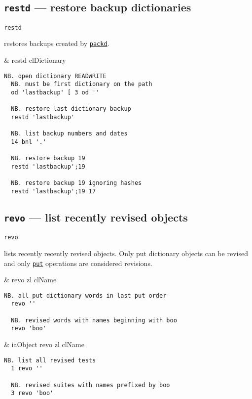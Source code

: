 \subsection{\texttt{restd} --- restore backup dictionaries}\label{ss:restd} 

\hypertarget{il:restd}{\texttt{restd}}  restores  backups created by
 \hyperlink{il:packd}{\texttt{packd}}. 

\begin{wordhead}
\monad & restd clDictionary \\
\end{wordhead}
\begin{lstlisting}[frame=single,framerule=0pt] 
  NB. open dictionary READWRITE 
  NB. must be first dictionary on the path
  od 'lastbackup' [ 3 od '' 

  NB. restore last dictionary backup
  restd 'lastbackup' 

  NB. list backup numbers and dates
  14 bnl '.'

  NB. restore backup 19 
  restd 'lastbackup';19

  NB. restore backup 19 ignoring hashes
  restd 'lastbackup';19 17
\end{lstlisting}                   


\subsection{\texttt{revo} --- list recently revised objects} 

\hypertarget{il:revo}{\texttt{revo}} lists recently recently revised objects. 
Only put dictionary objects can be revised and only 
\hyperlink{il:put}{\texttt{put}} operations are considered revisions. 

\begin{wordhead}
\monad & revo zl \argsep clName \\
\end{wordhead}
\begin{lstlisting}[frame=single,framerule=0pt] 
  NB. all put dictionary words in last put order
  revo ''   
    
  NB. revised words with names beginning with boo  
  revo 'boo'  
\end{lstlisting}  

\begin{wordhead}
\dyad & iaObject revo zl \argsep clName \\
\end{wordhead}
\begin{lstlisting}[frame=single,framerule=0pt] 
  NB. list all revised tests
  1 revo ''  
  
  NB. revised suites with names prefixed by boo 
  3 revo 'boo'  
\end{lstlisting}                  



